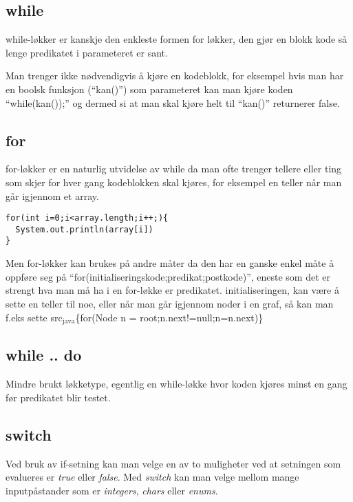 \documentclass[11pt]{article}
\begin{document}
\subsection{while}
\label{sec-5_1}

   
   while-løkker er kanskje den enkleste formen for løkker, den gjør en blokk kode
   så lenge predikatet i parameteret er sant. 

   Man trenger ikke nødvendigvis å kjøre
   en kodeblokk, for eksempel hvis man har en boolsk funksjon (``kan()'') som parameteret
   kan man kjøre koden ``while(kan());'' og dermed si at man skal kjøre helt til ``kan()''
   returnerer false.
\subsection{for}
\label{sec-5_2}

   
   for-løkker er en naturlig utvidelse av while da man ofte trenger tellere eller ting
   som skjer for hver gang kodeblokken skal kjøres, for eksempel en teller når man går
   igjennom et array.

\begin{verbatim}
for(int i=0;i<array.length;i++;){
  System.out.println(array[i])
}
\end{verbatim}

   Men for-løkker kan brukes på andre måter da den har en ganske enkel måte å oppføre 
   seg på ``for(initialiseringskode;predikat;postkode)'', eneste som det er strengt hva 
   man må ha i en for-løkke er predikatet. initialiseringen, kan være å sette en teller
   til noe, eller når man går igjennom noder i en graf, så kan man f.eks sette 
   src$_{\mathrm{java}}$\{for(Node n = root;n.next!=null;n=n.next)\}
\subsection{while .. do}
\label{sec-5_3}

   
   Mindre brukt løkketype, egentlig en while-løkke hvor koden kjøres minst en gang før
   predikatet blir testet.
  
\subsection{switch}
\label{sec-5_4}


Ved bruk av if-setning kan man velge en av to muligheter ved at
setningen som evalueres er \emph{true} eller \emph{false}. Med \emph{switch} kan man
velge mellom mange inputpåstander som er \emph{integers}, \emph{chars} eller \emph{enums}. 
\end{document}
